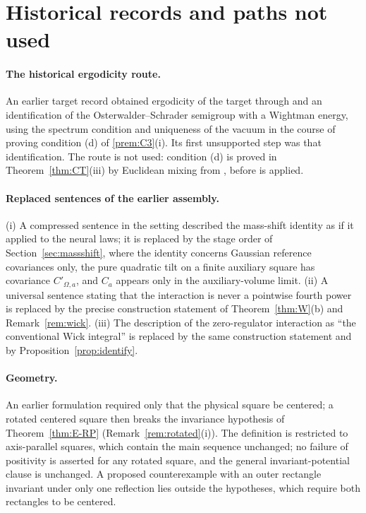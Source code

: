 \documentclass[11pt]{article}
\theoremstyle{plain}
\theoremstyle{definition}
\theoremstyle{remark}
\begin{document}
\section{Historical records and paths not used}\label{app:historical}

\paragraph{The historical ergodicity route.} An earlier target record obtained
ergodicity of the target through \cite[Thm.~4.4]{FS1977} and an identification of
the Osterwalder--Schrader semigroup with a Wightman energy, using the spectrum
condition and uniqueness of the vacuum in the course of proving condition (d) of
\ref{prem:C3}(i). Its first unsupported step was that identification. The route
is not used: condition (d) is proved in Theorem~\ref{thm:CT}(iii) by Euclidean
mixing from \cite[(7)--(8), (13)]{AHKZ1989}, before \cite[Thm.~1.0]{FS1977} is
applied.

\paragraph{Replaced sentences of the earlier assembly.} (i) A compressed sentence
in the setting described the mass-shift identity as if it applied to the
neural laws; it is replaced by the stage order of Section~\ref{sec:massshift},
where the identity concerns Gaussian reference covariances only, the pure
quadratic tilt on a finite auxiliary square has covariance $C'_{\Omega,a}$, and $C_a$
appears only in the auxiliary-volume limit. (ii) A universal sentence stating
that the interaction is never a pointwise fourth power is replaced by the precise
construction statement of Theorem~\ref{thm:W}(b) and Remark~\ref{rem:wick}. (iii) The
description of the zero-regulator interaction as ``the conventional Wick
integral'' is replaced by the same construction statement and by
Proposition~\ref{prop:identify}.

\paragraph{Geometry.} An earlier formulation required only that the physical
square be centered; a rotated centered square then breaks the invariance
hypothesis of Theorem~\ref{thm:E-RP} (Remark~\ref{rem:rotated}(i)). The definition is
restricted to axis-parallel squares, which contain the main sequence unchanged;
no failure of positivity is asserted for any rotated square, and the general
invariant-potential clause is unchanged. A proposed counterexample with an
outer rectangle invariant under only one reflection lies outside the hypotheses,
which require both rectangles to be centered.
\end{document}
